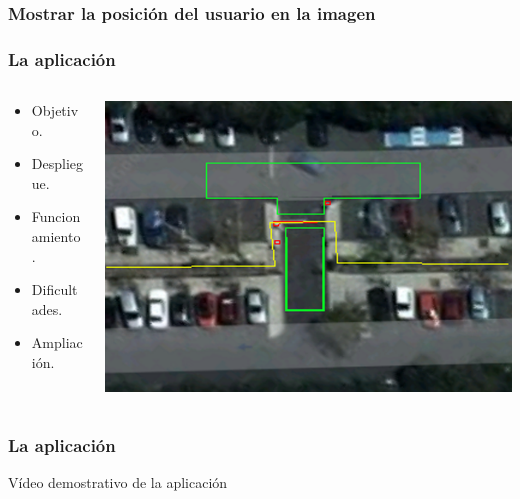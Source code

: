 \begin{frame}
	\frametitle{Mostrar la posición del usuario en la imagen}
	
\end{frame}

\begin{frame}
	\frametitle{La aplicación \BulletPoint{}}
	\begin{columns}
		\begin{column}{0.6\textwidth}
			\begin{itemize}
				\item Objetivo.
				\item Despliegue.
				\item Funcionamiento.
				\item Dificultades.
				\item Ampliación.
			\end{itemize}
			\endblock{}
		\end{column}
		\begin{column}{0.4\textwidth}
			\vfill 
			\begin{center}
				\includegraphics[width=0.9\linewidth]{Images/parking}
			\end{center}
		\end{column}
	\end{columns}
\end{frame}


\begin{frame}
	\frametitle{La aplicación \BulletPoint{}}
		Vídeo demostrativo de la aplicación \BulletPoint{}
\end{frame}